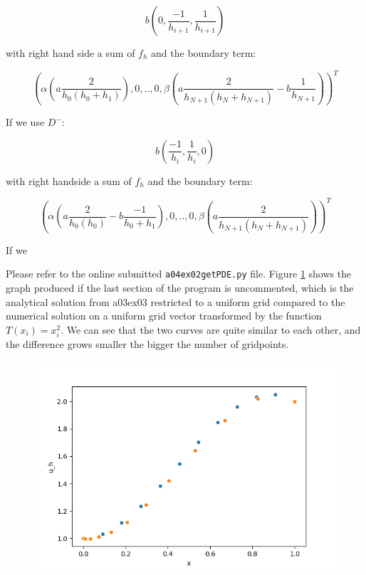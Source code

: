 $$
b(0,\frac{-1}{h_{i+1}},\frac{1}{h_{i+1}})
$$

with right hand side a sum of $f_h$ and the boundary term:

$$
(\alpha(a\frac{2}{h_0(h_0+h_{1})}),0,..,0,\beta(a\frac{2}{h_{N+1}(h_N+h_{N+1})}-b\frac{1}{h_{N+1}}))^T
$$


If we use $D^-$:

$$
b(\frac{-1}{h_{i}},\frac{1}{h_{i}},0)
$$

with right handside a sum of $f_h$ and the boundary term:

$$
(\alpha(a\frac{2}{h_0(h_0)}-b\frac{-1}{h_0+h_1}),0,..,0,\beta(a\frac{2}{h_{N+1}(h_N+h_{N+1})}))^T
$$


If we 

Please refer to the online submitted \texttt{a04ex02getPDE.py} file. Figure \ref{fig:a04e02PDE_solve} shows the graph produced if the last section of the program is uncommented, which is the analytical solution from a03ex03 restricted to a uniform grid compared to the numerical solution on a uniform grid vector transformed by the function $T(x_i)=x_i^2$. We can see that the two curves are quite similar to each other, and the difference grows smaller the bigger the number of gridpoints. 

\begin{figure}[H]
	\includegraphics[width=\textwidth]{Documentation/Figures/a04ex02PDE_solved.png} 
	\caption{}
	\label{fig:a04e02PDE_solve}
\end{figure}

%
%

%

%

%
